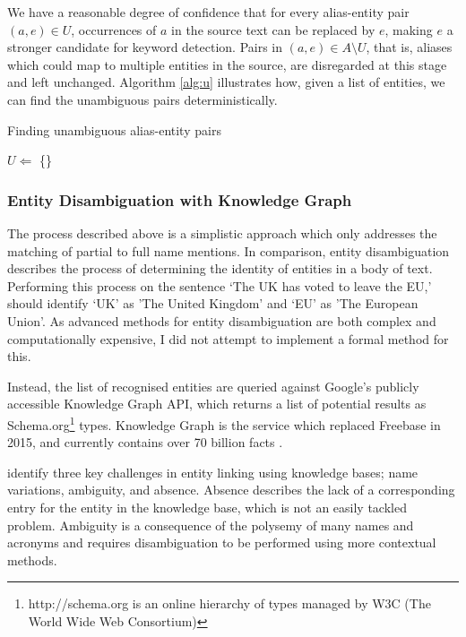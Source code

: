 We have a reasonable degree of confidence that for every alias-entity pair $(a, e) \in U$, occurrences of $a$ in the source text can be replaced by $e$, making $e$ a stronger candidate for keyword detection. Pairs in $(a, e) \in A\setminus{U}$, that is, aliases which could map to multiple entities in the source, are disregarded at this stage and left unchanged.  Algorithm \ref{alg:u} illustrates how, given a list of entities, we can find the unambiguous pairs deterministically. 

\begin{algorithm}
\label{alg:u}
 \caption{Finding unambiguous alias-entity pairs}
 $U \Leftarrow$ \{\}\;
\end{algorithm}


\subsubsection{Entity Disambiguation with Knowledge Graph}

The process described above is a simplistic approach which only addresses the matching of partial to full name mentions. In comparison, entity disambiguation describes the process of determining the identity of entities in a body of text. Performing this process on the sentence `The UK has voted to leave the EU,' should identify `UK' as 'The United Kingdom' and `EU' as 'The European Union'. As advanced methods for entity disambiguation are both complex and computationally expensive, I did not attempt to implement a formal method for this. 

Instead, the list of recognised entities are queried against Google's publicly accessible Knowledge Graph API, which returns a list of potential results as Schema.org\footnote{http://schema.org is an online hierarchy of types managed by W3C (The World Wide Web Consortium)} types. Knowledge Graph is the service which replaced Freebase in 2015, and currently contains over 70 billion facts \citep{knowledgegraph}.

\cite{EntityDisambiguationForKnowledgeBasePopulation} identify three key challenges in entity linking using knowledge bases; name variations, ambiguity, and absence. Absence describes the lack of a corresponding entry for the entity in the knowledge base, which is not an easily tackled problem. Ambiguity is a consequence of the polysemy of many names and acronyms and requires disambiguation to be performed using more contextual methods. 


